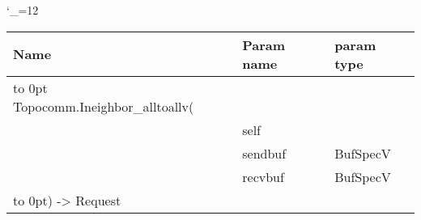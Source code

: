 \begingroup \catcode`\_=12 \tt
\begin{tabular}{lll}
\toprule
\textrm{Name}&\textrm{Param name}&\textrm{param type}\\
\midrule
\hbox to 0pt {Topocomm.Ineighbor_alltoallv(\hss}\\
& self\\
& sendbuf & BufSpecV\\
& recvbuf & BufSpecV\\
\hbox to 0pt{) -> Request\hss}\\
\bottomrule
\end{tabular}
\endgroup

